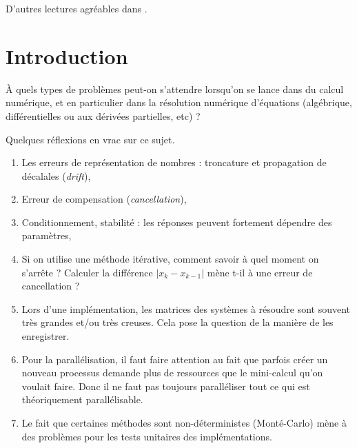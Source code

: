 
D'autres lectures agréables dans \cite{GianlucaB}.

\section{Introduction}

À quels types de problèmes peut-on s'attendre lorsqu'on se lance dans du calcul numérique, et en particulier dans la résolution numérique d'équations (algébrique, différentielles ou aux dérivées partielles, etc) ?

Quelques réflexions en vrac sur ce sujet.

\begin{enumerate}
	\item
	      Les erreurs de représentation de nombres : troncature et propagation de décalales (\emph{drift}),
	\item
	      Erreur de compensation (\emph{cancellation}),
	\item
	      Conditionnement, stabilité : les réponses peuvent fortement dépendre des paramètres,
	\item
	      Si on utilise une méthode itérative, comment savoir à quel moment on s'arrête ? Calculer la différence \( | x_k-x_{k-1} |\) mène t-il à une erreur de cancellation ?
	\item
	      Lors d'une implémentation, les matrices des systèmes à résoudre sont souvent très grandes et/ou très creuses. Cela pose la question de la manière de les enregistrer.
	\item
	      Pour la parallélisation, il faut faire attention au fait que parfois créer un nouveau processus demande plus de ressources que le mini-calcul qu'on voulait faire. Donc il ne faut pas toujours paralléliser tout ce qui est théoriquement parallélisable.
	\item
	      Le fait que certaines méthodes sont non-déterministes (Monté-Carlo) mène à des problèmes pour les tests unitaires des implémentations.
\end{enumerate}

